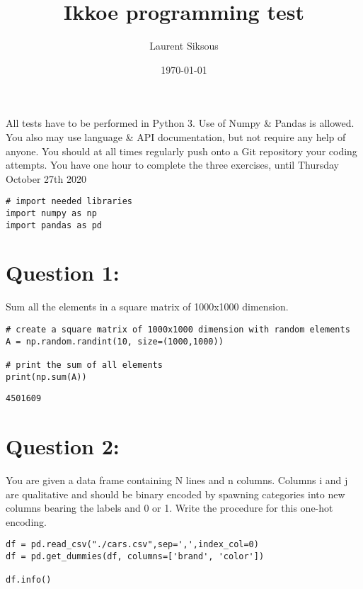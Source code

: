 \documentclass[11pt]{article}
\author{Laurent Siksous}
\date{\today}
\title{Ikkoe programming test}
\begin{document}
\maketitle
All tests have to be performed in Python 3. Use of Numpy \& Pandas is allowed. You also may use 
language \& API documentation, but not require any help of anyone.
You should at all times regularly push onto a Git repository your coding attempts.
You have one hour to complete the three exercises, until Thursday October 27th 2020

\begin{verbatim}
# import needed libraries
import numpy as np
import pandas as pd 
\end{verbatim}

\section{Question 1:}
\label{sec:org8a405fe}
Sum all the elements in a square matrix of 1000x1000 dimension.

\begin{verbatim}
# create a square matrix of 1000x1000 dimension with random elements
A = np.random.randint(10, size=(1000,1000))

# print the sum of all elements
print(np.sum(A))
\end{verbatim}

\begin{verbatim}
4501609
\end{verbatim}

\section{Question 2:}
\label{sec:org0d26560}
You are given a data frame containing N lines and n columns. Columns i and j are qualitative and 
should be binary encoded by spawning categories into new columns bearing the labels and 0 or 1. 
Write the procedure for this one-hot encoding.

\begin{verbatim}
df = pd.read_csv("./cars.csv",sep=',',index_col=0)
df = pd.get_dummies(df, columns=['brand', 'color'])

df.info()
\end{verbatim}
\end{document}
